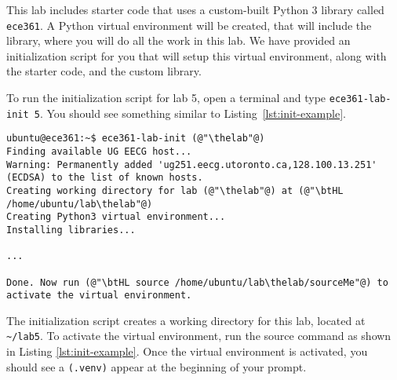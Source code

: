 \documentclass[11pt]{article}
\def\thelab{5}
\begin{document}
This lab includes starter code that uses a custom-built Python 3 library called \texttt{ece361}.
A Python virtual environment will be created, that will include the library, where you will do all the work in this lab.
We have provided an initialization script for you that will setup this virtual environment, along with the starter code, and the custom library.


To run the initialization script for lab \thelab, open a terminal and type \texttt{ece361-lab-init \thelab}.
You should see something similar to Listing~\ref{lst:init-example}.

\begin{lstlisting}[style=ece361shell, caption={Initializing lab \thelab.}, label={lst:init-example}]
ubuntu@ece361:~$ ece361-lab-init (@"\thelab"@)
Finding available UG EECG host...
Warning: Permanently added 'ug251.eecg.utoronto.ca,128.100.13.251' (ECDSA) to the list of known hosts.
Creating working directory for lab (@"\thelab"@) at (@"\btHL /home/ubuntu/lab\thelab"@)
Creating Python3 virtual environment...
Installing libraries...

...

Done. Now run (@"\btHL source /home/ubuntu/lab\thelab/sourceMe"@) to activate the virtual environment.
\end{lstlisting}

The initialization script creates a working directory for this lab, located at \texttt{\textasciitilde/lab\thelab}.
To activate the virtual environment, run the source command as shown in Listing \ref{lst:init-example}.
Once the virtual environment is activated, you should see a \texttt{(.venv)} appear at the beginning of your prompt.


\end{document}
